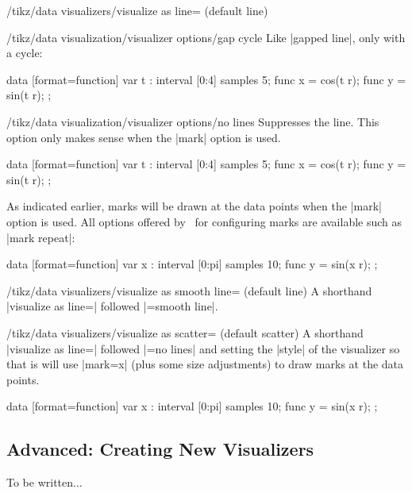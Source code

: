 \begin{key}{/tikz/data visualizers/visualize as line= (default line)}
 \begin{key}{/tikz/data visualization/visualizer options/gap cycle}
   Like |gapped line|, only with a cycle:
\begin{codeexample}[]
\tikz [scale=.55] \datavisualization
 [scientific clean axes, all axes={ticks=few},
  visualize as smooth line=my data,  my data={gap cycle}]
data [format=function] {
  var t : interval [0:4] samples 5;
  func x = cos(\value t r);
  func y = sin(\value t r);
};
\end{codeexample}
 \end{key}
 
 \begin{key}{/tikz/data visualization/visualizer options/no lines}
   Suppresses the line. This option only makes sense when the |mark|
   option is used.
\begin{codeexample}[]
\tikz [scale=.55] \datavisualization
 [scientific clean axes, all axes={ticks=few},
  visualize as smooth line=my data,  my data={no lines, style={mark=x}}]
data [format=function] {
  var t : interval [0:4] samples 5;
  func x = cos(\value t r);
  func y = sin(\value t r);
};
\end{codeexample}
 \end{key}

 As indicated earlier, marks will be drawn at the data points when the
 |mark| option is used. All options offered by \tikzname\ for
 configuring marks are available such as |mark repeat|: 
\begin{codeexample}[width=7cm]
\tikz \datavisualization
 [scientific clean axes, 
  visualize as line=my data,
  my data={style={mark=x, mark repeat=3}}]
data [format=function] {
  var x : interval [0:pi] samples 10;
  func y = sin(\value x r);
};
\end{codeexample} 
\end{key}


\begin{key}{/tikz/data visualizers/visualize as smooth line= (default line)}
  A shorthand |visualize as line=|
  followed |=smooth line|.
\end{key}

\begin{key}{/tikz/data visualizers/visualize as scatter= (default scatter)}
  A shorthand  |visualize as line=|
  followed  |=no lines| and setting
  the |style| of the visualizer so that is will use |mark=x| (plus
  some size adjustments) to draw marks at the data points. 
\begin{codeexample}[width=7cm]
\tikz {}
data [format=function] {
  var x : interval [0:pi] samples 10;
  func y = sin(\value x r);
};
\end{codeexample} 
\end{key}


\subsection{Advanced: Creating New Visualizers}

To be written...
